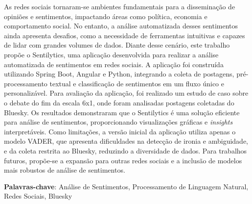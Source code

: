 \documentclass[
	12pt,				%
	oneside,			%
	a4paper,			%
	english,			%
	french,				%
	spanish,			%
	brazil				%
	]{abntex2}
\begin{document}
\setlength{\absparsep}{18pt} %
\begin{resumo}

  As redes sociais tornaram-se ambientes fundamentais para a disseminação
  de opiniões e sentimentos, impactando áreas como política, economia e
  comportamento social. No entanto, a análise automatizada desses
  sentimentos ainda apresenta desafios, como a necessidade de ferramentas
  intuitivas e capazes de lidar com grandes volumes de dados. Diante desse
  cenário, este trabalho propõe o Sentilytics, uma aplicação desenvolvida
  para realizar a análise automatizada de sentimentos em redes sociais. A
  aplicação foi construída utilizando Spring Boot, Angular e Python,
  integrando a coleta de postagens, pré-processamento textual e
  classificação de sentimentos em um fluxo único e personalizável. Para
  avaliação da aplicação, foi realizado um estudo de caso sobre o debate
  do fim da escala 6x1, onde foram analisadas postagens coletadas do
  Bluesky. Os resultados demonstraram que o Sentilytics é uma solução
  eficiente para análise de sentimentos, proporcionando visualizações
  gráficas e \emph{insights} interpretáveis. Como limitações, a versão
  inicial da aplicação utiliza apenas o modelo VADER, que apresenta
  dificuldades na detecção de ironia e ambiguidade, e da coleta restrita
  ao Bluesky, reduzindo a diversidade de dados. Para trabalhos futuros,
  propõe-se a expansão para outras redes sociais e a inclusão de modelos
  mais robustos de análise de sentimentos.

 \textbf{Palavras-chave}: Análise de Sentimentos, Processamento de Linguagem Natural, Redes
Sociais, Bluesky
\end{resumo}


\end{document}
